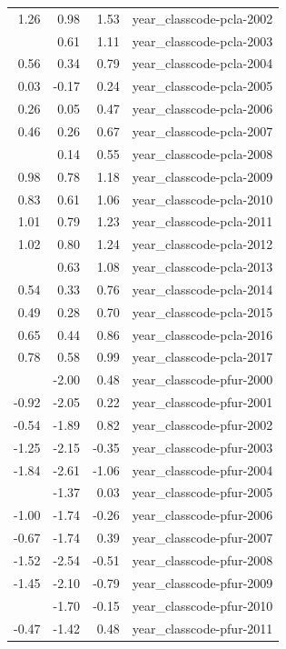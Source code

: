 \documentclass[]{article}
\begin{document}
\begin{longtable}[t]{rrrl}
1.26 & 0.98 & 1.53 & year\_classcode-pcla-2002\\
\addlinespace
0.86 & 0.61 & 1.11 & year\_classcode-pcla-2003\\
0.56 & 0.34 & 0.79 & year\_classcode-pcla-2004\\
0.03 & -0.17 & 0.24 & year\_classcode-pcla-2005\\
0.26 & 0.05 & 0.47 & year\_classcode-pcla-2006\\
0.46 & 0.26 & 0.67 & year\_classcode-pcla-2007\\
\addlinespace
0.35 & 0.14 & 0.55 & year\_classcode-pcla-2008\\
0.98 & 0.78 & 1.18 & year\_classcode-pcla-2009\\
0.83 & 0.61 & 1.06 & year\_classcode-pcla-2010\\
1.01 & 0.79 & 1.23 & year\_classcode-pcla-2011\\
1.02 & 0.80 & 1.24 & year\_classcode-pcla-2012\\
\addlinespace
0.86 & 0.63 & 1.08 & year\_classcode-pcla-2013\\
0.54 & 0.33 & 0.76 & year\_classcode-pcla-2014\\
0.49 & 0.28 & 0.70 & year\_classcode-pcla-2015\\
0.65 & 0.44 & 0.86 & year\_classcode-pcla-2016\\
0.78 & 0.58 & 0.99 & year\_classcode-pcla-2017\\
\addlinespace
-0.76 & -2.00 & 0.48 & year\_classcode-pfur-2000\\
-0.92 & -2.05 & 0.22 & year\_classcode-pfur-2001\\
-0.54 & -1.89 & 0.82 & year\_classcode-pfur-2002\\
-1.25 & -2.15 & -0.35 & year\_classcode-pfur-2003\\
-1.84 & -2.61 & -1.06 & year\_classcode-pfur-2004\\
\addlinespace
-0.67 & -1.37 & 0.03 & year\_classcode-pfur-2005\\
-1.00 & -1.74 & -0.26 & year\_classcode-pfur-2006\\
-0.67 & -1.74 & 0.39 & year\_classcode-pfur-2007\\
-1.52 & -2.54 & -0.51 & year\_classcode-pfur-2008\\
-1.45 & -2.10 & -0.79 & year\_classcode-pfur-2009\\
\addlinespace
-0.92 & -1.70 & -0.15 & year\_classcode-pfur-2010\\
-0.47 & -1.42 & 0.48 & year\_classcode-pfur-2011\\

\end{longtable}
\end{document}
